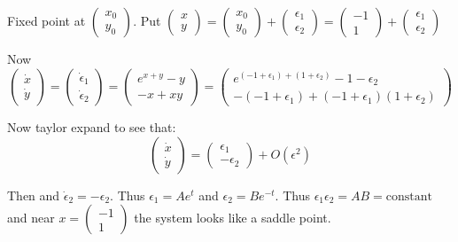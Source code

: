 Fixed point at $\begin{pmatrix} x_0 \\ y_0 \end{pmatrix}$. Put $\begin{pmatrix} x \\ y \end{pmatrix} = \begin{pmatrix} x_0 \\ y_0 \end{pmatrix} + \begin{pmatrix} \epsilon_1 \\ \epsilon_2 \end{pmatrix} = \begin{pmatrix} -1 \\ 1 \end{pmatrix} + \begin{pmatrix} \epsilon_1 \\ \epsilon_2 \end{pmatrix}$

Now $$\begin{pmatrix} \dot{x} \\ \dot{y} \end{pmatrix} = \begin{pmatrix} \dot{\epsilon}_1 \\ \dot{\epsilon}_2 \end{pmatrix} = \begin{pmatrix} e^{x+y} - y \\ -x + xy \end{pmatrix} = \begin{pmatrix} e^{(-1 + \epsilon_1) + (1+\epsilon_2)} -1 - \epsilon_2 \\ - (-1 + \epsilon_1) + (-1 +\epsilon_1)(1+\epsilon_2) \end{pmatrix}$$

Now taylor expand to see that: $$\begin{pmatrix} \dot{x} \\ \dot{y} \end{pmatrix} = \begin{pmatrix} \epsilon_1 \\ - \epsilon_2 \end{pmatrix} + O(\epsilon^2)$$

Then and $\dot{\epsilon}_2 = -\epsilon_2$. Thus $\epsilon_1 = A e^t$ and $\epsilon_2 = B e^{-t}$. Thus $\epsilon_1 \epsilon_2 = AB = \text{constant}$ and near $x = \begin{pmatrix} -1 \\ 1 \end{pmatrix}$ the system looks like a saddle point.

